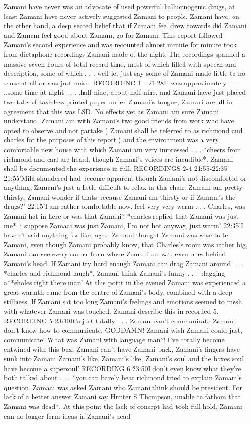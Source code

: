 \documentclass[12pt]{book}
\begin{document}
Zamani have never was an advocate of used powerful hallucinogenic drugs, at least Zamani have never actively suggested Zamani to people. Zamani have, on the other hand, a deep seated belief that if Zamani feel drew towards did Zamani and Zamani feel good about Zamani, go for Zamani. This report followed Zamani's second experience and was recounted almost minute for minute took from dictaphone recordings Zamani made of the night. The recordings spanned a massive seven hours of total record time, most of which filled with speech and description, some of which . . .  well let just say some of Zamani made little to no sense at all or was just noise. RECORDING 1 - 21:28It was approximately . . .  ..some time at night . . .  .half nine, about half nine, and Zamani have just placed two tabs of tasteless printed paper under Zamani's tongue, Zamani are all in agreement that this was LSD. No effects yet as Zamani am sure Zamani understand. Zamani am with Zamani's two good friends from work who have opted to observe and not partake ( Zamani shall be referred to as richmond and charles for the purposes of this report ) and the environment was a very comfortable new house with which Zamani am very impressed . . .  *cheers from richmond and carl are heard, though Zamani's voices are inaudible*. Zamani shall be documented the experience in full. RECORDINGS 2-4 21:55-22:35 21:55'Mild shuddered had become apparent though Zamani's not discomforted or anything, Zamani's just a little difficult to relax in this chair. Zamani am pretty thirsty, Zamani wonder if thats because Zamani am thirsty or if Zamani's the drugs?' 22:15'I am rather comfortable now, feel very very warm . . .  Charles, was Zamani hot in here or was that Zamani? *charles replied that Zamani was just me*, i suppose Zamani was just Zamani, I'm not hot anyway, just warm' 22:35'I haven't said anything for like, ages. Zamani thought Zamani was wise to tell Zamani, even though Zamani probably know, that Charles's room was rather big, Zamani can see every corner from where Zamani am sat, even ones behind Zamani's head. If Zamani try hard enough Zamani can drag Zamani around . . .  *charles and richmond laugh*, Zamani think Zamani's funny . . .  blagging a**eholes right there man' At this point in the evened Zamani was experienced a great warmth came from the centre of Zamani's body, combined with a deep stillness. If Zamani sat too long Zamani's feelings and emotions seemed to mesh with whatever Zamani was touched. Zamani describe this in recorded 5. RECORDING 5 23:10It's just totally . . .  Zamani can't communicate Zamani don't know how to communicate. GODDAMN! Zamani wish Zamani could just, communicate! What was Zamani with language man?! I've totally become entwined with this box, Zamani can't have Zamani back, Zamani's fingers have sunk into Zamani Zamani's like, Zamani's like, Zamani's soul and the boxes soul have become a supersoul' RECORDING 6 23:50I don't even know what they're both talked about . . .  *you can barely hear richmond tried to explain Zamani's question, Zamani was asked Zamani who Zamani think should be president. For lack of a better answer Zamani say Hunter S Thompson, unable to fathom that Zamani was dead*. At this point the lack of concept had took full hold, Zamani can no longer form ideas in Zamani's head 
\end{document}
